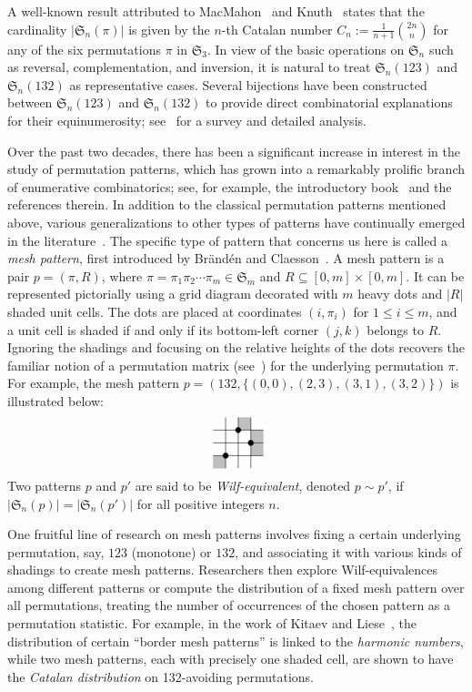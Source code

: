 \documentclass[12pt,reqno]{article}
\numberwithin{equation}{section}
\theoremstyle{plain}
\theoremstyle{definition}
\newcommand{\pattern}[4]{			
	\raisebox{0.6ex}{
		\begin{tikzpicture}[scale=0.35, baseline=(current bounding box.center), #1]
			\foreach \x/\y in {#4}		\fill[gray!50] (\x,\y) rectangle +(1,1);
			
			\draw (0.01,0.01) grid (#2+0.99,#2+0.99);
			\foreach \x/\y in {#3}		\filldraw (\x,\y) circle (6pt);
	\end{tikzpicture}}
}
\begin{document}
A well-known result attributed to MacMahon~\cite{Mac60} and Knuth~\cite{Knu75} states that the cardinality $|\mathfrak{S}_n(\pi)|$ is given by the $n$-th Catalan number $C_n := \frac{1}{n+1} \binom{2n}{n}$ for any of the six permutations $\pi$ in $\mathfrak{S}_3$. In view of the basic operations on $\mathfrak{S}_n$ such as reversal, complementation, and inversion, it is natural to treat $\mathfrak{S}_n(123)$ and $\mathfrak{S}_n(132)$ as representative cases. Several bijections have been constructed between $\mathfrak{S}_n(123)$ and $\mathfrak{S}_n(132)$ to provide direct combinatorial explanations for their equinumerosity; see~\cite{CK08} for a survey and detailed analysis.

Over the past two decades, there has been a significant increase in interest in the study of permutation patterns, which has grown into a remarkably prolific branch of enumerative combinatorics; see, for example, the introductory book~\cite{Kit11} and the references therein. In addition to the classical permutation patterns mentioned above, various generalizations to other types of patterns have continually emerged in the literature~\cite[Chapters 5, 6, 7]{Kit11}. The specific type of pattern that concerns us here is called a \emph{mesh pattern}, first introduced by Br\"and\'en and Claesson~\cite{BC11}. A mesh pattern is a pair $p = (\pi, R)$, where $\pi = \pi_1 \pi_2 \cdots \pi_m \in \mathfrak{S}_m$ and $R \subseteq [0,m] \times [0,m]$. It can be represented pictorially using a grid diagram decorated with $m$ heavy dots and $|R|$ shaded unit cells. The dots are placed at coordinates $(i, \pi_i)$ for $1 \le i \le m$, and a unit cell is shaded if and only if its bottom-left corner $(j,k)$ belongs to $R$. Ignoring the shadings and focusing on the relative heights of the dots recovers the familiar notion of a permutation matrix (see~\cite[Section~1.5]{Sta11}) for the underlying permutation $\pi$. For example, the mesh pattern $p = (132, \{(0,0), (2,3), (3,1), (3,2)\})$ is illustrated below:
$$
\pattern{scale=1}{3}{1/1,2/3,3/2}{0/0,2/3,3/1,3/2}
$$
Two patterns $p$ and $p'$ are said to be \emph{Wilf-equivalent}, denoted $p \sim p'$, if $|\mathfrak{S}_n(p)| = |\mathfrak{S}_n(p')|$ for all positive integers $n$.


One fruitful line of research on mesh patterns involves fixing a certain underlying permutation, say, $123$ (monotone) or $132$, and associating it with various kinds of shadings to create mesh patterns. Researchers then explore Wilf-equivalences among different patterns or compute the distribution of a fixed mesh pattern over all permutations, treating the number of occurrences of the chosen pattern as a permutation statistic. For example, in the work of Kitaev and Liese~\cite{KL13}, the distribution of certain ``border mesh patterns'' is linked to the \emph{harmonic numbers}, while two mesh patterns, each with precisely one shaded cell, are shown to have the \emph{Catalan distribution} on 132-avoiding permutations.
\end{document}
